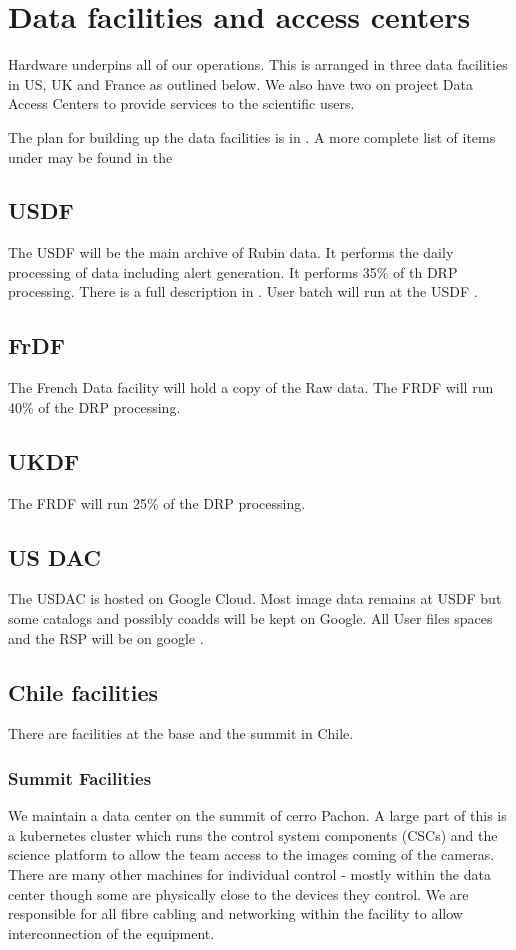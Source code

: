 \section{Data facilities and access centers} \label{sec:datafacilities}
Hardware underpins all of our operations.
This is arranged in three data facilities in US, UK and France as outlined below.
We also have two on project Data Access Centers to provide services to the scientific users.

The plan for building up the data facilities is in .
A more complete list of items under may be found in the 

\subsection{USDF}
The USDF will be the main archive of Rubin data. It performs the daily processing of data including alert generation.
It performs 35\% of th DRP processing.
There is a full description in .
User batch will run at the USDF .

\subsection{FrDF}
The French Data facility will hold a copy of the Raw data.
The FRDF will run 40\% of the DRP processing.

\subsection{UKDF}
The FRDF will run 25\% of the DRP processing.

\subsection{US DAC}
The USDAC is hosted on Google Cloud.
Most image data remains at USDF but some catalogs and possibly coadds will be kept on Google.
All User files spaces and the RSP will be on google .

\subsection{Chile facilities}\label{sec:chilefacilities}
There are facilities at the base and the summit in Chile.

\subsubsection{Summit Facilities}
We maintain a data center on the summit of cerro Pachon.
A large part of this is a kubernetes cluster which runs the control system components (CSCs) and the science platform to allow the team access to the images coming of the cameras.
There are many other machines for individual control - mostly within the data center though some are physically close to the devices they control.
We are responsible for all fibre cabling and networking  within the facility to allow interconnection of the equipment.

